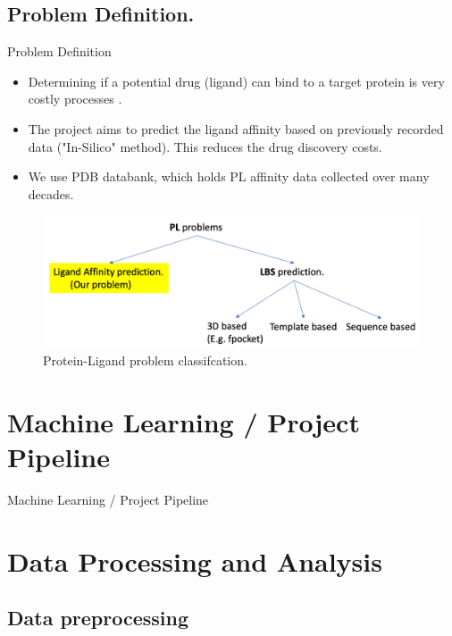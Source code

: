 \documentclass{beamer}
\begin{document}
\subsection{Problem Definition.}

\begin{frame}[t]{Problem Definition}

\begin{itemize}
\item Determining if a potential drug (ligand) can bind to a target protein is very costly processes \cite{drugdiscoverycost}.
\item The project aims to predict the ligand affinity based on previously recorded data ("In-Silico" method).  This reduces the drug discovery costs.
\item We use PDB databank,  which holds PL affinity data collected over many decades.
\end{itemize}

\begin{figure}[htb]
  \centering
    \includegraphics[scale=0.25]{images/pl_problem_classification}
    \caption{Protein-Ligand problem classifcation.}
    \label{fig:plproblemclassification}
\end{figure}


\end{frame}

\section{Machine Learning / Project Pipeline}
\begin{frame}[t]{Machine Learning / Project Pipeline}


\end{frame}

\section{Data Processing and Analysis}

\subsection{Data preprocessing}
\end{document}
